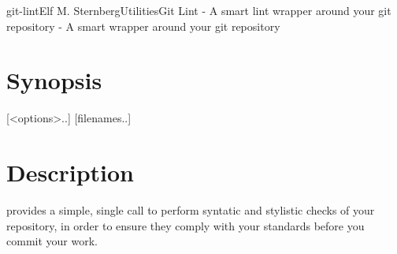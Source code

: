 \documentclass[english]{article}
\begin{document}
\begin{Name}{1}{git-lint}{Elf M. Sternberg}{Utilities}{Git Lint - A smart lint wrapper around your git repository}
   - A smart wrapper around your git repository
\end{Name}

\section{Synopsis}

 [<options>..] [filenames..]

\section{Description}
 provides a simple, single call to perform syntatic and stylistic
checks of your repository, in order to ensure they comply with your standards
before you commit your work.
\end{document}

